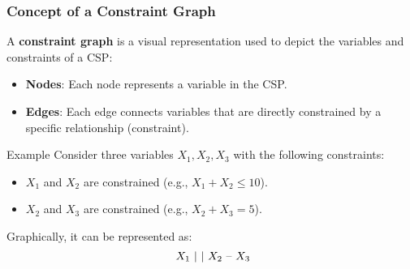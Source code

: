 \documentclass[aspectratio=169]{beamer}
\begin{document}
\begin{frame}[fragile]
    \frametitle{Concept of a Constraint Graph}
    A \textbf{constraint graph} is a visual representation used to depict the variables and constraints of a CSP:
    \begin{itemize}
        \item \textbf{Nodes}: Each node represents a variable in the CSP.
        \item \textbf{Edges}: Each edge connects variables that are directly constrained by a specific relationship (constraint).
    \end{itemize}
    \begin{block}{Example}
        Consider three variables \(X_1, X_2, X_3\) with the following constraints:
        \begin{itemize}
            \item \(X_1\) and \(X_2\) are constrained (e.g., \(X_1 + X_2 \leq 10\)).
            \item \(X_2\) and \(X_3\) are constrained (e.g., \(X_2 + X_3 = 5\)).
        \end{itemize}
        Graphically, it can be represented as:
        \begin{equation*}
            \text{   } X_1 \\
            \text{    |} \\
            \text{    |} \\
            \text{   } X_2 \text{ -- } X_3
        \end{equation*}
    \end{block}
\end{frame}
\end{document}
